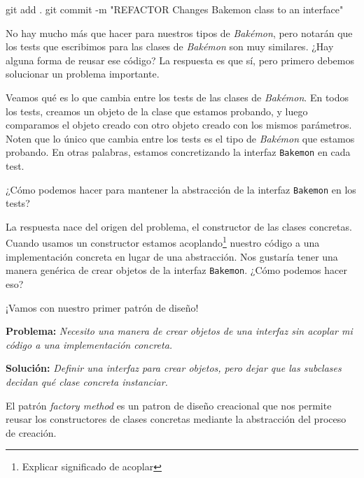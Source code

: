   \begin{powershell}
    git add .
    git commit -m "REFACTOR Changes Bakemon class to an interface"
  \end{powershell}

  No hay mucho más que hacer para nuestros tipos de \textit{Bakémon}, pero notarán que los tests que
  escribimos para las clases de \textit{Bakémon} son muy similares.
  ¿Hay alguna forma de reusar ese código?
  La respuesta es que sí, pero primero debemos solucionar un problema importante.

  Veamos qué es lo que cambia entre los tests de las clases de \textit{Bakémon}.
  En todos los tests, creamos un objeto de la clase que estamos probando, y luego comparamos
  el objeto creado con otro objeto creado con los mismos parámetros.
  Noten que lo único que cambia entre los tests es el tipo de \textit{Bakémon} que estamos
  probando.
  En otras palabras, estamos concretizando la interfaz \texttt{Bakemon} en cada test.

  ¿Cómo podemos hacer para mantener la abstracción de la interfaz \texttt{Bakemon} en los tests?

  La respuesta nace del origen del problema, el constructor de las clases concretas.
  Cuando usamos un constructor estamos acoplando\footnote{Explicar significado de acoplar} nuestro código a una implementación concreta en
  lugar de una abstracción.
  Nos gustaría tener una manera genérica de crear objetos de la interfaz \texttt{Bakemon}.
  ¿Cómo podemos hacer eso?

  ¡Vamos con nuestro primer patrón de diseño!

  \begin{defaultbox}
    \textbf{Problema:} \textit{Necesito una manera de crear objetos de una interfaz sin acoplar
    mi código a una implementación concreta.}

    \textbf{Solución:} \textit{Definir una interfaz para crear objetos, pero dejar que las
    subclases decidan qué clase concreta instanciar.}
  \end{defaultbox}

  El patrón \textit{factory method} es un patron de diseño creacional que nos permite reusar los constructores de clases concretas mediante la
  abstracción del proceso de creación.

